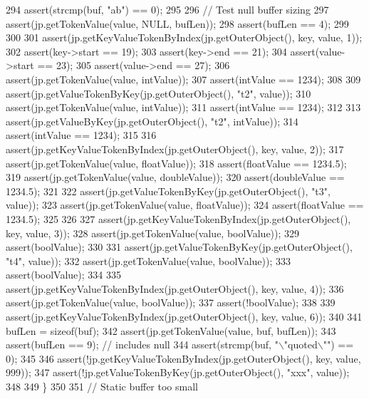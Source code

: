 \begin{DoxyCode}
{{{{{294         assert(strcmp(buf, \textcolor{stringliteral}{"ab"}) == 0);
295 
296         \textcolor{comment}{// Test null buffer sizing}
297         assert(jp.getTokenValue(value, NULL, bufLen));
298         assert(bufLen == 4);
299 
300 
301         assert(jp.getKeyValueTokenByIndex(jp.getOuterObject(), key, value, 1));
302         assert(key->start == 19);
303         assert(key->end == 21);
304         assert(value->start == 23);
305         assert(value->end == 27);
306         assert(jp.getTokenValue(value, intValue));
307         assert(intValue == 1234);
308 
309         assert(jp.getValueTokenByKey(jp.getOuterObject(), \textcolor{stringliteral}{"t2"}, value));
310         assert(jp.getTokenValue(value, intValue));
311         assert(intValue == 1234);
312 
313         assert(jp.getValueByKey(jp.getOuterObject(), \textcolor{stringliteral}{"t2"}, intValue));
314         assert(intValue == 1234);
315 
316         assert(jp.getKeyValueTokenByIndex(jp.getOuterObject(), key, value, 2));
317         assert(jp.getTokenValue(value, floatValue));
318         assert(floatValue == 1234.5);
319         assert(jp.getTokenValue(value, doubleValue));
320         assert(doubleValue == 1234.5);
321 
322         assert(jp.getValueTokenByKey(jp.getOuterObject(), \textcolor{stringliteral}{"t3"}, value));
323         assert(jp.getTokenValue(value, floatValue));
324         assert(floatValue == 1234.5);
325 
326 
327         assert(jp.getKeyValueTokenByIndex(jp.getOuterObject(), key, value, 3));
328         assert(jp.getTokenValue(value, boolValue));
329         assert(boolValue);
330 
331         assert(jp.getValueTokenByKey(jp.getOuterObject(), \textcolor{stringliteral}{"t4"}, value));
332         assert(jp.getTokenValue(value, boolValue));
333         assert(boolValue);
334 
335         assert(jp.getKeyValueTokenByIndex(jp.getOuterObject(), key, value, 4));
336         assert(jp.getTokenValue(value, boolValue));
337         assert(!boolValue);
338 
339         assert(jp.getKeyValueTokenByIndex(jp.getOuterObject(), key, value, 6));
340 
341         bufLen = \textcolor{keyword}{sizeof}(buf);
342         assert(jp.getTokenValue(value, buf, bufLen));
343         assert(bufLen == 9); \textcolor{comment}{// includes null}
344         assert(strcmp(buf, \textcolor{stringliteral}{"\(\backslash\)"quoted\(\backslash\)""}) == 0);
345 
346         assert(!jp.getKeyValueTokenByIndex(jp.getOuterObject(), key, value, 999));
347         assert(!jp.getValueTokenByKey(jp.getOuterObject(), \textcolor{stringliteral}{"xxx"}, value));
348 
349     \}
350 
351     \textcolor{comment}{// Static buffer too small}
}}}}}
\end{DoxyCode}
